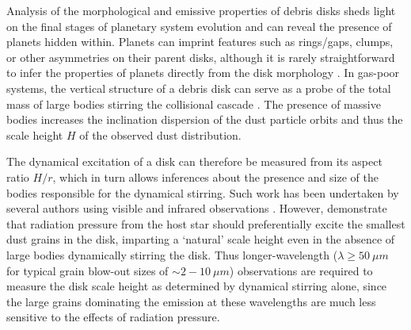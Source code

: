 \documentclass[modern]{aastex62}
\begin{document}
Analysis of the morphological and emissive properties of debris disks sheds light on the final stages of planetary system evolution and can reveal the presence of planets hidden within.
Planets can imprint features such as rings/gaps, clumps, or other asymmetries on their parent disks, although it is rarely straightforward to infer the properties of planets directly from the disk morphology \citep[see the review by][and references therein]{hughes18}.
In gas-poor systems, the vertical structure of a debris disk can serve as a probe of the total mass of large bodies stirring the collisional cascade \citep{thebault09}.
The presence of massive bodies increases the inclination dispersion of the dust particle orbits and thus the scale height $H$ of the observed dust distribution.

The dynamical excitation of a disk can therefore be measured from its aspect ratio $H/r$, which in turn allows inferences about the presence and size of the bodies responsible for the dynamical stirring.
Such work has been undertaken by several authors using visible and infrared observations \citep{artymowicz97,thebault&augereau07,quillen07}.
However, \cite{thebault09} demonstrate that radiation pressure from the host star should preferentially excite the smallest dust grains in the disk, imparting a `natural' scale height even in the absence of large bodies dynamically stirring the disk. 
Thus longer-wavelength ($\lambda \geq \SI{50}{\mu m}$ for typical grain blow-out sizes of $\sim 2-\SI{10}{\mu m}$) observations are required to measure the disk scale height as determined by dynamical stirring alone, since the large grains dominating the emission at these wavelengths are much less sensitive to the effects of radiation pressure.
\end{document}
